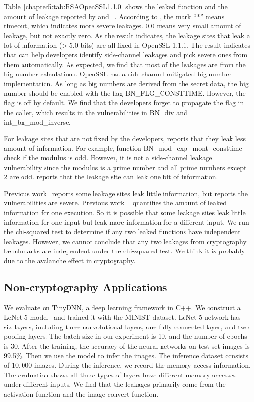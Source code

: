 Table~\ref{chapter5:tab:RSAOpenSSL1.1.0} shows the leaked function and the amount of leakage reported by \ctool{} and \tool{}~\cite{bao2021abacus}. According to \tool{}\cite{bao2021abacus}, the mark ``$*$'' means timeout, which indicates more severe leakages. $0.0$ means very small amount of leakage, but not exactly zero. As the result indicates, the leakage sites that leak a lot of information (> 5.0 bits) are all fixed in OpenSSL 1.1.1. The result indicates that \ctool{} can help developers identify side-channel leakages and pick severe ones from them automatically. As expected, we find that most of the leakages are from the big number calculations. OpenSSL has a side-channel mitigated big number implementation. As long as big numbers are derived from the secret data, the big number should be enabled with the flag \textsf{BN\_FLG\_CONSTTIME}. However, the flag is off by default. We find that the developers forget to propagate the flag in the caller, which results in the vulnerabilities in \textsf{BN\_div} and \textsf{int\_bn\_mod\_inverse}. 

For leakage sites that are not fixed by the developers, \ctool{} reports that they leak less amount of information. For example, function \textsf{BN\_mod\_exp\_mont\_consttime} check if the modulus is odd. However, it is not a side-channel leakage vulnerability since the modulus is a prime number and all prime numbers except $2$ are odd. \ctool{} reports that the leakage site can leak one bit of information. 

Previous work~\cite{bao2021abacus} reports some leakage sites leak little information, but \ctool{} reports the vulnerabilities are severe. Previous work \tool{}~\cite{bao2021abacus} quantifies the amount of leaked information for one execution. So it is possible that some leakage sites leak little information for one input but leak more information for a different input. We run the chi-squared test to determine if any two leaked functions have independent leakages. However, we cannot conclude that any two leakages from cryptography benchmarks are independent under the chi-squared test. We think it is probably due to the avalanche effect in cryptography.

\subsection{Non-cryptography Applications}



We evaluate \ctool{} on TinyDNN, a deep learning framework in C++. We
construct a LeNet-5 model~\cite{lecun1998gradient} and trained it with
the MINIST dataset. LeNet-5 network has six layers, including three
convolutional layers, one fully connected layer, and two pooling
layers. The batch size in our experiment is 10, and the number of
epochs is 30. After the training, the accuracy of the neural networks
on test set images is 99.5\%. Then we use the model to infer the
images. The inference dataset consists of $10,000$ images.  During the
inference, we record the memory access information. The evaluation
shows all three types of layers have different memory accesses under
different inputs. We find that the leakages primarily come from the
activation function and the image convert function.
